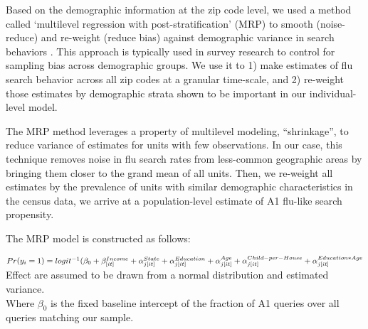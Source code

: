 \documentclass[12pt]{article}
\begin{document}
Based on the demographic information at the zip code level, we used a method called `multilevel regression with post-stratification' (MRP) to smooth (noise-reduce) and re-weight (reduce bias) against demographic variance in search behaviors \citep{gelman_and_little_1997, park_gelman_bafumi_2004}. This approach is typically used in survey research to control for sampling bias across demographic groups. We use it to 1) make estimates of flu search behavior across all zip codes at a granular time-scale, and 2) re-weight those estimates by demographic strata shown to be important in our individual-level model. 

The MRP method leverages a property of multilevel modeling, ``shrinkage'', to reduce variance of estimates for units with few observations. In our case, this technique removes noise in flu search rates from less-common geographic areas by bringing them closer to the grand mean of all units. Then, we re-weight all estimates by the prevalence of units with similar demographic characteristics in the census data, we arrive at a population-level estimate of A1 flu-like search propensity. 

The MRP model is constructed as follows:

$Pr(y_i = 1) = logit^{-1}( \beta_0  + \beta_{[it]}^{Income}
+ \alpha_{j[it]}^{State}  
+ \alpha_{j[it]}^{Education}  
+ \alpha_{j[it]}^{Age} \\
+ \alpha_{j[it]}^{Child-per-House}
+ \alpha_{j[it]}^{Education*Age} $
\\

Effect are assumed to be drawn from a normal distribution and estimated variance. \\


Where $\beta_0$ is the fixed baseline intercept of the fraction of A1 queries over all queries matching our sample. 
\end{document}
